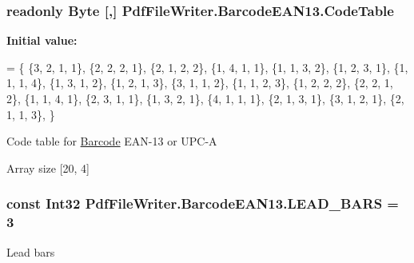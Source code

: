\subsubsection[{\texorpdfstring{Code\+Table}{CodeTable}}]{\setlength{\rightskip}{0pt plus 5cm}readonly Byte \mbox{[},\mbox{]} Pdf\+File\+Writer.\+Barcode\+E\+A\+N13.\+Code\+Table\hspace{0.3cm}{\ttfamily [static]}}\hypertarget{class_pdf_file_writer_1_1_barcode_e_a_n13_a83712fff996406d424848ca5a59e7507}{}\label{class_pdf_file_writer_1_1_barcode_e_a_n13_a83712fff996406d424848ca5a59e7507}
{\bfseries Initial value\+:}
\begin{DoxyCode}
= 
        \{
        \{3, 2, 1, 1\},       
        \{2, 2, 2, 1\},       
        \{2, 1, 2, 2\},       
        \{1, 4, 1, 1\},       
        \{1, 1, 3, 2\},       
        \{1, 2, 3, 1\},       
        \{1, 1, 1, 4\},       
        \{1, 3, 1, 2\},       
        \{1, 2, 1, 3\},       
        \{3, 1, 1, 2\},       
        \{1, 1, 2, 3\},       
        \{1, 2, 2, 2\},       
        \{2, 2, 1, 2\},       
        \{1, 1, 4, 1\},       
        \{2, 3, 1, 1\},       
        \{1, 3, 2, 1\},       
        \{4, 1, 1, 1\},       
        \{2, 1, 3, 1\},       
        \{3, 1, 2, 1\},       
        \{2, 1, 1, 3\},       
        \}
\end{DoxyCode}


Code table for \hyperlink{class_pdf_file_writer_1_1_barcode}{Barcode} E\+A\+N-\/13 or U\+P\+C-\/A 

Array size \mbox{[}20, 4\mbox{]}
\subsubsection[{\texorpdfstring{L\+E\+A\+D\+\_\+\+B\+A\+RS}{LEAD_BARS}}]{\setlength{\rightskip}{0pt plus 5cm}const Int32 Pdf\+File\+Writer.\+Barcode\+E\+A\+N13.\+L\+E\+A\+D\+\_\+\+B\+A\+RS = 3}\hypertarget{class_pdf_file_writer_1_1_barcode_e_a_n13_ab823da95d829468f727ea96b07f06459}{}\label{class_pdf_file_writer_1_1_barcode_e_a_n13_ab823da95d829468f727ea96b07f06459}


Lead bars 

